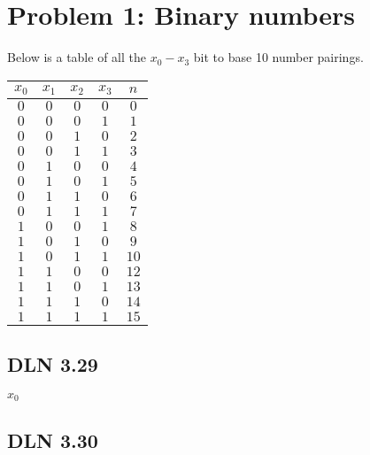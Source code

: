 \documentclass[titlepage]{article}
\begin{document}
 \maketitle

\section{Problem 1: Binary numbers}

Below is a table of all the \(x_0-x_3\) bit to base 10 number pairings.

\begin{center}
\begin{tabular}{c c c c|c}
\textbf{$x_0$} & \textbf{$x_1$} & \textbf{$x_2$} & \textbf{$x_3$} & \textbf{$n$} \\ \hline
\(0\) & \(0\) & \(0\) & \(0\) & \(0\)\\
\(0\) & \(0\) & \(0\) & \(1\) & \(1\)\\
\(0\) & \(0\) & \(1\) & \(0\) & \(2\)\\
\(0\) & \(0\) & \(1\) & \(1\) & \(3\)\\
\(0\) & \(1\) & \(0\) & \(0\) & \(4\)\\
\(0\) & \(1\) & \(0\) & \(1\) & \(5\)\\
\(0\) & \(1\) & \(1\) & \(0\) & \(6\)\\
\(0\) & \(1\) & \(1\) & \(1\) & \(7\)\\
\(1\) & \(0\) & \(0\) & \(1\) & \(8\)\\
\(1\) & \(0\) & \(1\) & \(0\) & \(9\)\\
\(1\) & \(0\) & \(1\) & \(1\) & \(10\)\\
\(1\) & \(1\) & \(0\) & \(0\) & \(12\)\\
\(1\) & \(1\) & \(0\) & \(1\) & \(13\)\\
\(1\) & \(1\) & \(1\) & \(0\) & \(14\)\\
\(1\) & \(1\) & \(1\) & \(1\) & \(15\)\\

\end{tabular}
\end{center}

\subsection{DLN 3.29}  %

$x_0$

\subsection{DLN 3.30} 
\end{document}
